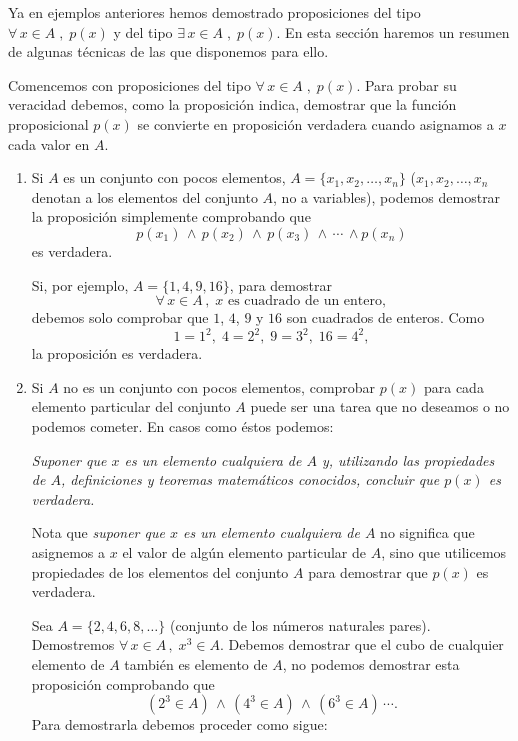 Ya en ejemplos anteriores hemos demostrado proposiciones del tipo
$\forall\,x \in A\;,\; p(x)$ y del tipo $\exists\,x\in A\;,\;p(x)$.
En esta secci\'on haremos un resumen de algunas t\'ecnicas de las que
disponemos para ello.

Comencemos con proposiciones del tipo  $\forall\, x\in A\;,\;
p(x)$. 
Para probar su veracidad debemos, como la proposici\'on indica,  
demostrar que 
la funci\'on proposicional $p(x)$ se convierte en proposici\'on
verdadera cuando asignamos a $x$ cada valor en $A$. 

\begin{enumerate}
	\item Si $A$ es un conjunto con pocos elementos, $A = \{x_1, x_2, \ldots, x_n\}$
		($x_1, x_2, \ldots, x_n$ denotan a los elementos del conjunto $A$, no
		a variables), podemos demostrar la proposici\'on simplemente comprobando
		que 
		\[
			p(x_1)\,\wedge\,p(x_2)\,\wedge\,p(x_3)\,\wedge\,\cdots\,\wedge p(x_n)
		\]
		es verdadera.
		
		Si, por ejemplo, $A=\{1,4,9,16\}$, para demostrar
		$$\forall\,x\in A\, ,\; x\mbox{ es cuadrado de un entero},$$ debemos
		solo comprobar que $1$, $4$, $9$ y $16$ son cuadrados de enteros.
		Como
		\[
			1 = 1^2,\;4 = 2^2,\; 9=3^2,\; 16 = 4^2,
		\]
		la proposici\'on es verdadera.
		
	\medskip 
		
	\item Si $A$ no es un conjunto con pocos
		elementos, comprobar $p(x)$ para cada elemento 
		particular del
		conjunto $A$ puede ser una tarea que no
		deseamos o no podemos cometer. 
		En casos como \'estos podemos:
		\begin{center}
			{\em Suponer que $x$ es un elemento cualquiera de $A$ y, 			
			utilizando las propiedades de $A$, definiciones y teoremas
			matem\'aticos conocidos, 			
			concluir que $p(x)$ es verdadera.}
		\end{center}
	
		Nota que {\em suponer que $x$ es un elemento cualquiera de $A$} no
		significa que asignemos a $x$ el valor de alg\'un elemento
		particular de $A$, sino que utilicemos propiedades de los elementos
		del conjunto $A$ para demostrar que $p(x)$ es verdadera.
		
		Sea $A = \{2,4,6,8,\ldots\}$ (conjunto de los n\'umeros naturales
		pares). Demostremos $\forall\, x \in A\, ,\;x^3 \in A$.
		Debemos demostrar que el cubo de cualquier elemento de 
		$A$ tambi\'en es elemento de $A$, no podemos demostrar
		esta proposici\'on comprobando que 
		\[
			(2^3 \in A)\, \wedge\,(4^3 \in A)\, \wedge\, (6^3 \in A)\,\cdots.
		\]
		Para demostrarla debemos proceder como sigue:
		

\end{enumerate}
